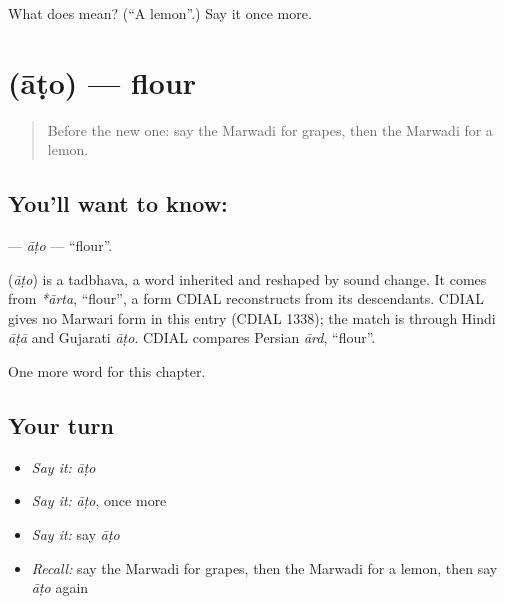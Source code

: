 \begin{tcolorbox}[breakable,colback=teal!4,colframe=teal!35!black,title={Before you move on}]
What does  mean? (\textquotedblleft{}A lemon\textquotedblright{}.) Say it once more.
\end{tcolorbox}
\section[\texorpdfstring{\mw{आटो} (āṭo)}{आटो (āṭo)}]{ (āṭo) — flour}

\label{lesson:MW-C61-ato}



\begin{quote}
Before the new one: say the Marwadi for grapes, then the Marwadi for a lemon.
\end{quote}

\subsection*{You'll want to know: }
\textbf{} — \emph{āṭo} — \textquotedblleft{}flour\textquotedblright{}.

\begin{cousinweb}
\textbf{} (\emph{āṭo}) is a tadbhava, a word inherited and reshaped by sound change. It comes from \emph{*ārta}, \textquotedblleft{}flour\textquotedblright{}, a form CDIAL reconstructs from its descendants. CDIAL gives no Marwari form in this entry (CDIAL 1338); the match is through Hindi \emph{āṭā} and Gujarati \emph{āṭo}. CDIAL compares Persian \emph{ārd}, \textquotedblleft{}flour\textquotedblright{}.
\end{cousinweb}

\begin{grammarlens}[title={What you've built}]
One more word for this chapter.
\end{grammarlens}

\subsection*{Your turn}
\begin{itemize}
\raggedright
  \item \emph{Say it:} \emph{āṭo}
  \item \emph{Say it:} \emph{āṭo}, once more
  \item \emph{Say it:} say \emph{āṭo}
  \item \emph{Recall:} say the Marwadi for grapes, then the Marwadi for a lemon, then say \emph{āṭo} again
\end{itemize}


